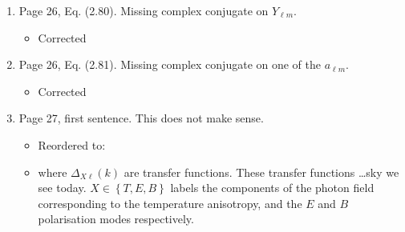 \documentclass[11pt]{article}
\begin{document}
\begin{enumerate}
{  ``the temperature field is anisotropic on account of the
  relativistic nature of photons''?
}
\item Page 26, Eq. (2.80). Missing complex conjugate on $Y_{\ell m}$.
  \begin{itemize}
    \item Corrected
  \end{itemize}
\item Page 26, Eq. (2.81). Missing complex conjugate on one of the
  $a_{\ell m}$.
  \begin{itemize}
    \item Corrected
  \end{itemize}
\item Page 27, first sentence. This does not make sense.
  \begin{itemize}
    \item Reordered to:
    \item where \(\Delta_{X\ell}(k)\) are transfer functions. These transfer functions \ldots  sky we see today. 
 \({X\in\left\{ T,E,B \right\}}\) labels the components of the photon field corresponding to the temperature anisotropy, and the \(E\) and \(B\) polarisation modes respectively.
  \end{itemize}
\end{enumerate}
\end{document}
